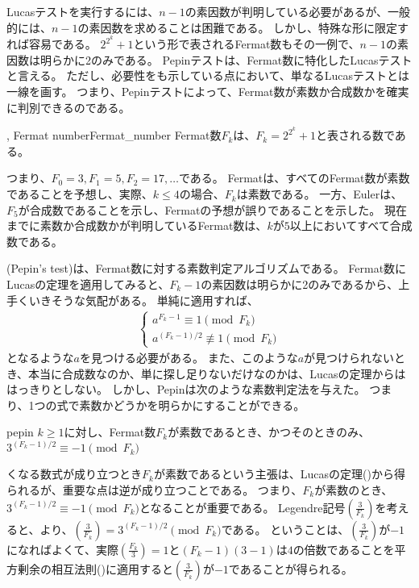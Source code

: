 Lucasテストを実行するには、$n-1$の素因数が判明している必要があるが、一般的には、$n-1$の素因数を求めることは困難である。
しかし、特殊な形に限定すれば容易である。
$2^{2^k} + 1$という形で表されるFermat数もその一例で、$n-1$の素因数は明らかに2のみである。
Pepinテストは、Fermat数に特化したLucasテストと言える。
ただし、必要性をも示している点において、単なるLucasテストとは一線を画す。
つまり、Pepinテストによって、Fermat数が素数か合成数かを確実に判別できるのである。

\begin{Defi}{, Fermat number}{Fermat_number}
Fermat数$F_k$は、$F_k=2^{2^k} + 1$と表される数である。
\end{Defi}

つまり、$F_0=3, F_1 = 5, F_2 = 17,\ldots$である。
Fermatは、すべてのFermat数が素数であることを予想し、実際、$k \le 4$の場合、$F_k$は素数である。
一方、Eulerは、$F_5$が合成数であることを示し、Fermatの予想が誤りであることを示した。
現在までに素数か合成数かが判明しているFermat数は、$k$が$5$以上においてすべて合成数である。

(Pepin's test)は、Fermat数に対する素数判定アルゴリズムである。
Fermat数にLucasの定理を適用してみると、$F_k - 1$の素因数は明らかに2のみであるから、上手くいきそうな気配がある。
単純に適用すれば、
\begin{align*}
\begin{cases}
a^{F_k-1} \equiv 1 \pmod{F_k}\\
a^{(F_k-1)/2} \not\equiv 1 \pmod{F_k}
\end{cases}
\end{align*}
となるような$a$を見つける必要がある。
また、このような$a$が見つけられないとき、本当に合成数なのか、単に探し足りないだけなのかは、Lucasの定理からははっきりとしない。
しかし、Pepinは次のような素数判定法を与えた。
つまり、1つの式で素数かどうかを明らかにすることができる。

\begin{Theo}{}{pepin}
$k\ge1$に対し、Fermat数$F_k$が素数であるとき、かつそのときのみ、$3^{(F_k - 1)/2}\equiv-1\pmod{F_k}$
\end{Theo}

くなる数式が成り立つとき$F_k$が素数であるという主張は、Lucasの定理()から得られるが、重要な点は逆が成り立つことである。
つまり、$F_k$が素数のとき、$3^{(F_k - 1)/2}\equiv-1\pmod{F_k}$となることが重要である。
Legendre記号$\left(\frac{3}{F_k}\right)$を考えると、より、$\left(\frac{3}{F_k}\right)=3^{(F_k - 1)/2}\pmod{F_k}$である。
ということは、$\left(\frac{3}{F_k}\right)$が$-1$になればよくて、実際$\left(\frac{F_k}{3}\right)=1$と$(F_k-1)(3-1)$は$4$の倍数であることを平方剰余の相互法則()に適用すると$\left(\frac{3}{F_k}\right)$が$-1$であることが得られる。

